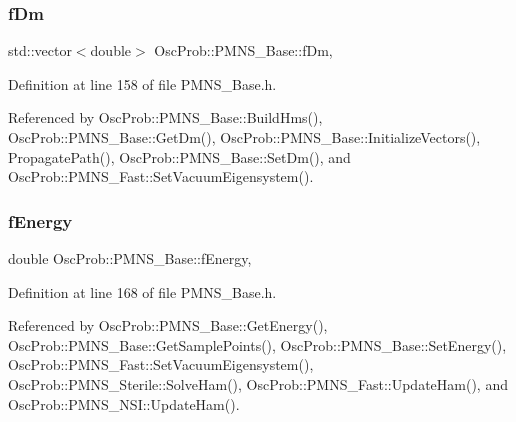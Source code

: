 \subsubsection{\texorpdfstring{f\+Dm}{fDm}}
{\footnotesize\ttfamily std\+::vector$<$double$>$ Osc\+Prob\+::\+P\+M\+N\+S\+\_\+\+Base\+::f\+Dm\hspace{0.3cm}{\ttfamily [protected]}, {\ttfamily [inherited]}}



Definition at line 158 of file P\+M\+N\+S\+\_\+\+Base.\+h.



Referenced by Osc\+Prob\+::\+P\+M\+N\+S\+\_\+\+Base\+::\+Build\+Hms(), Osc\+Prob\+::\+P\+M\+N\+S\+\_\+\+Base\+::\+Get\+Dm(), Osc\+Prob\+::\+P\+M\+N\+S\+\_\+\+Base\+::\+Initialize\+Vectors(), Propagate\+Path(), Osc\+Prob\+::\+P\+M\+N\+S\+\_\+\+Base\+::\+Set\+Dm(), and Osc\+Prob\+::\+P\+M\+N\+S\+\_\+\+Fast\+::\+Set\+Vacuum\+Eigensystem().

\mbox{\label{classOscProb_1_1PMNS__Base_a2800af6d436972f3e900867790c046b0}} 
\subsubsection{\texorpdfstring{f\+Energy}{fEnergy}}
{\footnotesize\ttfamily double Osc\+Prob\+::\+P\+M\+N\+S\+\_\+\+Base\+::f\+Energy\hspace{0.3cm}{\ttfamily [protected]}, {\ttfamily [inherited]}}



Definition at line 168 of file P\+M\+N\+S\+\_\+\+Base.\+h.



Referenced by Osc\+Prob\+::\+P\+M\+N\+S\+\_\+\+Base\+::\+Get\+Energy(), Osc\+Prob\+::\+P\+M\+N\+S\+\_\+\+Base\+::\+Get\+Sample\+Points(), Osc\+Prob\+::\+P\+M\+N\+S\+\_\+\+Base\+::\+Set\+Energy(), Osc\+Prob\+::\+P\+M\+N\+S\+\_\+\+Fast\+::\+Set\+Vacuum\+Eigensystem(), Osc\+Prob\+::\+P\+M\+N\+S\+\_\+\+Sterile\+::\+Solve\+Ham(), Osc\+Prob\+::\+P\+M\+N\+S\+\_\+\+Fast\+::\+Update\+Ham(), and Osc\+Prob\+::\+P\+M\+N\+S\+\_\+\+N\+S\+I\+::\+Update\+Ham().

\mbox{\label{classOscProb_1_1PMNS__Base_a6319c34d7decbb9d7d6da279c06e8c2d}} 
